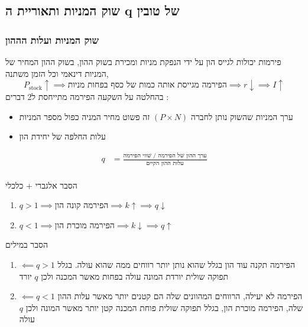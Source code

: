 \documentclass[usenames,dvipsnames]{beamer}
\begin{document}
\begin{RTL}
\section{שוק המניות ותאוריית ה q של טובין}
\begin{frame}[allowframebreaks]
    \frametitle{שוק המניות ועלות הההון}
    פירמות יכולות לגייס הון על ידי הנפקת מניות ומכירת בשוק ההון, בשוק ההון המחיר של המניות דינאמי וכל הזמן משתנה,
    \begin{equation*}
        P_{\text{stock}} \uparrow \implies \text{הפירמה מגייסת אותה כמות של כסף בפחות מניות} \implies r \downarrow \implies I \uparrow
    \end{equation*}
    בהחלטה על השקעה הפירמה מתייחסת ל2 דברים : 
    \begin{itemize}
        \item ערך המניות שהשוק נותן לחברה $\left(P \times N \right)$ זה פשוט מחיר המניה כפול מספר המניות
        \item עלות החלפה של יחידת הון
    \end{itemize}
    \begin{align*}
    q &= \frac{\text{ערך ההון של הפירמה / שווי הפירמה}}{\text{עלות ההון הקיים}}  \\  
    \end{align*}
    \framebreak
    \begin{block}{הסבר אלגברי + כלכלי}
        \begin{enumerate}
            \item $q > 1 \implies \text{הפירמה קונה הון} \implies k \uparrow  \implies q \downarrow$
            \item $q < 1 \implies \text{הפירמה מוכרת הון}  \implies k \downarrow \implies q \uparrow$
        \end{enumerate}

    \end{block}
    \begin{block}{הסבר במילים}
        \begin{enumerate}
            \item $\impliedby q>1$ הפירמה תקנה עוד הון בגלל שהוא נותן יותר רווחים ממה שהוא עולה. בגלל תפוקה שולית יורדת המונה עולה בפחות מאשר המכנה ולכן $q$ יורד
            \item $\impliedby q<1$ הפירמה לא יעילה, הרווחים המהוונים שלה הם קטנים יותר מאשר עלות ההון שלה, הפירמה מוכרת הון, בגלל תפוקה שולית פוחת המכנה קטן יותר מאשר המונה ולכן $q$ עולה 
        \end{enumerate}
    \end{block}
   


\end{frame}
\end{RTL}
\end{document}
